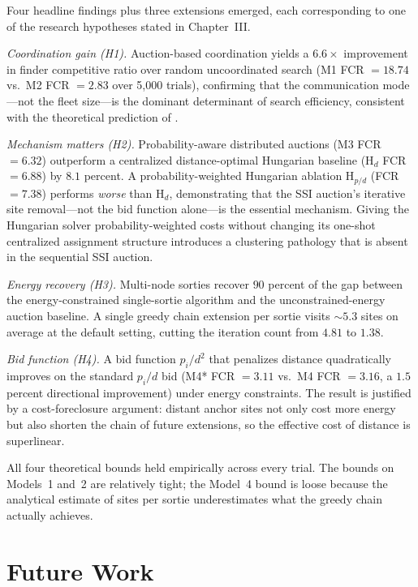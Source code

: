\begin{doublespacing}
Four headline findings plus three extensions emerged, each
corresponding to one of the research hypotheses stated in
Chapter~III.

\emph{Coordination gain (H1).}
Auction-based coordination yields a $6.6\times$ improvement in
finder competitive ratio over random uncoordinated search (M1 FCR $= 18.74$
vs.\ M2 FCR $= 2.83$ over 5,000 trials), confirming
that the communication mode---not the fleet size---is the dominant
determinant of search efficiency, consistent with the theoretical
prediction of \citet{Chrobak2015}.

\emph{Mechanism matters (H2).}
Probability-aware distributed auctions (M3 FCR $= 6.32$) outperform a centralized
distance-optimal Hungarian baseline (H$_d$ FCR $= 6.88$) by $8.1$ percent.
A probability-weighted Hungarian ablation H$_{p/d}$ (FCR $= 7.38$)
performs \emph{worse} than H$_d$, demonstrating that the SSI auction's
iterative site removal---not the bid function alone---is the essential
mechanism. Giving the Hungarian solver probability-weighted costs without
changing its one-shot centralized assignment structure introduces a
clustering pathology that is absent in the sequential SSI auction.

\emph{Energy recovery (H3).}
Multi-node sorties recover $90$ percent of the gap between the
energy-constrained single-sortie algorithm and the
unconstrained-energy auction baseline. A single greedy chain extension
per sortie visits $\sim\!5.3$ sites on average at the default setting,
cutting the iteration count from $4.81$ to $1.38$.

\emph{Bid function (H4).}
A bid function $p_i / d^2$ that penalizes distance quadratically
improves on the standard $p_i / d$ bid (M4* FCR $= 3.11$ vs.\ M4 FCR $= 3.16$,
a $1.5$ percent directional improvement) under energy
constraints. The result is justified by a cost-foreclosure argument:
distant anchor sites not only cost more energy but also shorten the
chain of future extensions, so the effective cost of distance is
superlinear.

All four theoretical bounds held empirically across every trial. The
bounds on Models~1 and~2 are relatively tight; the Model~4 bound is
loose because the analytical estimate of sites per sortie
underestimates what the greedy chain actually achieves.

\section{Future Work}


\end{doublespacing}
